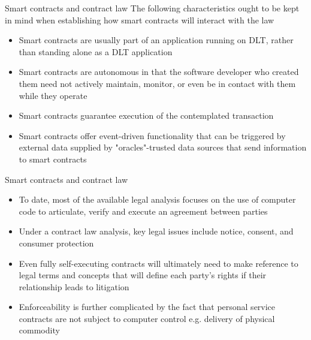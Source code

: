 \documentclass[9pt]{beamer}
\begin{document}


\begin{frame}{Smart contracts and contract law}
	The following characteristics ought to be kept in mind when establishing how smart contracts will interact with the law
	\begin{itemize}
		\item Smart contracts are usually part of an application running on DLT, rather than standing alone as a DLT application
		\item Smart contracts are autonomous in that the software developer who created them need not actively maintain, monitor, or even be in contact with them while they operate
		\item Smart contracts guarantee execution of the contemplated transaction
		\item Smart contracts offer event-driven functionality that can be triggered by external data  supplied by "oracles"-trusted data sources that send information to smart contracts
	\end{itemize}
\end{frame}


\begin{frame}{Smart contracts and contract law}
	\begin{itemize}
		\item To date, most of the available legal analysis focuses on the use of computer code to articulate, verify and execute an agreement between parties
		\item Under a contract law analysis, key legal issues include notice, consent, and consumer protection
		\item Even fully self-executing contracts will ultimately need to make reference to legal terms and concepts that will define each party's rights if their relationship leads to litigation
		\item Enforceability is further complicated by the fact that personal service contracts are not subject to computer control e.g. delivery of physical commodity
	\end{itemize}
\end{frame}
\end{document}
